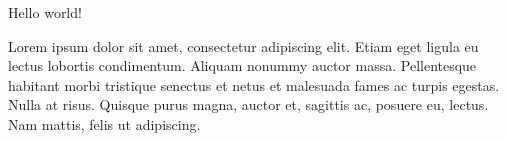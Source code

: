 \documentclass[12pt]{article}
\begin{document}
Hello world!


Lorem ipsum dolor sit amet, consectetur adipiscing elit. Etiam eget ligula eu lectus lobortis condimentum. Aliquam nonummy auctor massa. Pellentesque habitant morbi tristique senectus et netus et malesuada fames ac turpis egestas. Nulla at risus. Quisque purus magna, auctor et, sagittis ac, posuere eu, lectus. Nam mattis, felis ut adipiscing.
\end{document}
